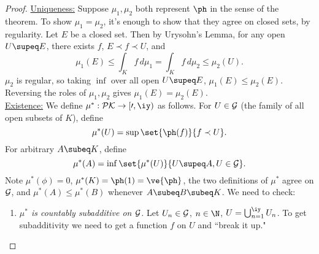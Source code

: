 \begin{proof}
\ul{Uniqueness:}
Suppose $\mu_1,\mu_2$ both represent $\ph$ in the sense of the theorem. To show $\mu_1=\mu_2$, it's enough to show that they agree on closed sets, by regularity. Let $E$ be a closed set. Then by Urysohn's Lemma, for any open $U\supeq E$, there exists $f$, $E\prec f\prec U$, and
\[
\mu_1(E)\le \int_K f\,d\mu_1=\int_Kf\,d\mu_2\le \mu_2(U).
\]
$\mu_2$ is regular, so taking $\inf$ over all open $U\supeq E$, $\mu_1(E)\le \mu_2(E)$. Reversing the roles of $\mu_1,\mu_2$ gives $\mu_1(E)=\mu_2(E)$.\\

\noindent \ul{Existence:} We define $\mu^*:\cal PK\to [0,\iy)$ as follows.
For $U\in \cal G$ (the family of all open subsets of $K$), define
\[
\mu^*(U)=\sup\set{\ph(f)}{f\prec U}.
\]
For arbitrary $A\subeq K$, define \[\mu^*(A)=\inf\set{\mu^*(U)}{U\supeq A,U\in \cal G}.\]
Note $\mu^*(\phi)=0$, $\mu^*(K)=\ph(1)=\ve{\ph}$, the two definitions of $\mu^*$ agree on $\cal G$, and $\mu^*(A)\le \mu^*(B)$ whenever $A\subeq B\subeq K$. We need to check:
\begin{enumerate}
\item
{\it $\mu^*$ is countably subadditive on $\cal G$.} Let $U_n\in \cal G$, $n\in \N$, $U=\bigcup_{n=1}^{\iy} U_n$. To get subadditivity we need to get a function $f$ on $U$ and ``break it up."


\end{enumerate}
\end{proof}
